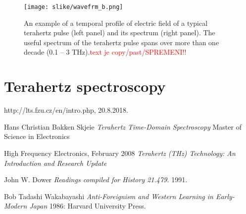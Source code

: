 \documentclass[english,11pt,a4paper]{article}
\numberwithin{equation}{section} %
\numberwithin{figure}{section} %
\numberwithin{table}{section} %
\begin{document}
\begin{figure}[!htb]
\label{TDS-spectrum}
\centering
\texttt{[image: slike/wavefrm\_b.png]}
\caption{ An example of a temporal profile of electric field of a typical terahertz pulse (left panel) and its spectrum (right panel). The useful spectrum of the terahertz pulse spans over more than one decade (0.1 – 3 THz).\textcolor{red}{text je copy/past/SPREMENI!!}  \cite{em-spectrum}}
\end{figure}
%
%
%
%
%
%



\section{Terahertz spectroscopy}




\newpage

  \begin{thebibliography}{}


     http://lts.fzu.cz/en/intro.php, 20.8.2018.

   Hans Christian Bakken Skjeie {\em Terahertz Time-Domain Spectroscopy} Master of Science in Electronics

   High Frequency Electronics, February 2008 {\em Terahertz (THz) Technology: An Introduction and Research Update}


   John W. Dower {\em Readings compiled for History  21.479.}  1991.
  
   Bob Tadashi Wakabayashi {\em Anti-Foreignism and Western
  Learning in Early-Modern Japan} 1986: Harvard University Press.

  \end{thebibliography}
\end{document}
